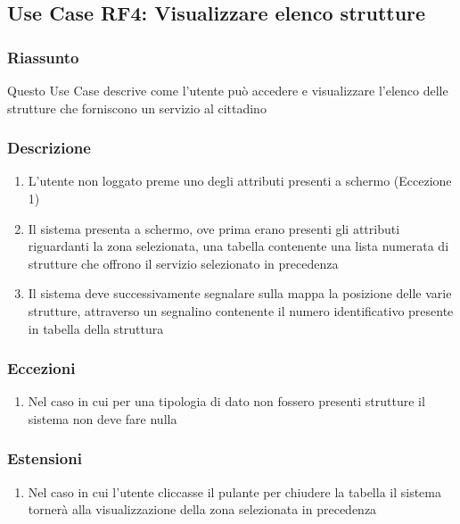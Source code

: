     \subsection{Use Case RF4: Visualizzare elenco strutture}
        \subsubsection{Riassunto}
            Questo Use Case descrive come l'utente può accedere e visualizzare l'elenco delle strutture che forniscono un servizio al cittadino
        \subsubsection{Descrizione}
            \begin{enumerate}
                \item L'utente non loggato preme uno degli attributi presenti a schermo (Eccezione 1)
                \item Il sistema presenta a schermo, ove prima erano presenti gli attributi riguardanti la zona selezionata, una tabella contenente una lista numerata di strutture che offrono il servizio selezionato in precedenza
                \item Il sistema deve successivamente segnalare sulla mappa la posizione delle varie strutture, attraverso un segnalino contenente il numero identificativo presente in tabella della struttura
            \end{enumerate}
        \subsubsection{Eccezioni}
            \begin{enumerate}
                \item Nel caso in cui per una tipologia di dato non fossero presenti strutture il sistema non deve fare nulla
            \end{enumerate}
        \subsubsection{Estensioni}
            \begin{enumerate}
                \item Nel caso in cui l'utente cliccasse il pulante per chiudere la tabella il sistema tornerà alla visualizzazione della zona selezionata in precedenza
            \end{enumerate}

